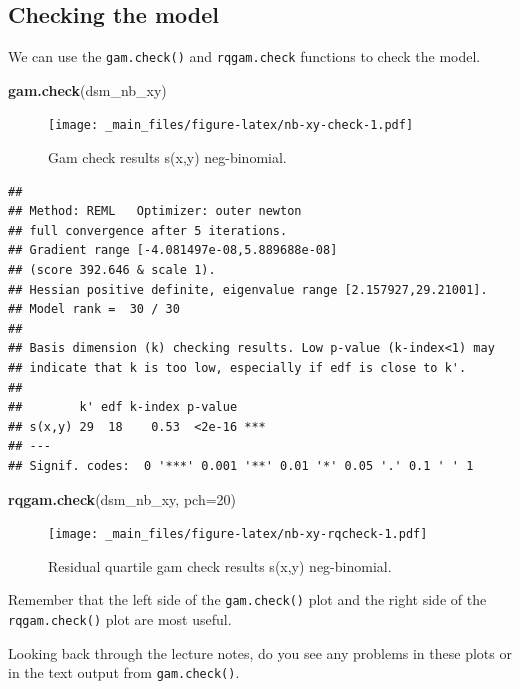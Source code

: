 \documentclass[]{book}
\newenvironment{Shaded}{\begin{snugshade}}{\end{snugshade}}
\newcommand{\KeywordTok}[1]{\textcolor[rgb]{0.13,0.29,0.53}{\textbf{#1}}}
\newcommand{\DataTypeTok}[1]{\textcolor[rgb]{0.13,0.29,0.53}{#1}}
\newcommand{\DecValTok}[1]{\textcolor[rgb]{0.00,0.00,0.81}{#1}}
\newcommand{\NormalTok}[1]{#1}
\theoremstyle{definition}
\theoremstyle{definition}
\theoremstyle{remark}
\begin{document}
\subsection{Checking the model}\label{checking-the-model}

We can use the \texttt{gam.check()} and \texttt{rqgam.check} functions
to check the model.

\begin{Shaded}
\begin{Highlighting}[]
\KeywordTok{gam.check}\NormalTok{(dsm_nb_xy)}
\end{Highlighting}
\end{Shaded}

\begin{figure}
\centering
\texttt{[image: \_main\_files/figure-latex/nb-xy-check-1.pdf]}
\caption{\label{fig:nb-xy-check}Gam check results s(x,y) neg-binomial.}
\end{figure}

\begin{verbatim}
## 
## Method: REML   Optimizer: outer newton
## full convergence after 5 iterations.
## Gradient range [-4.081497e-08,5.889688e-08]
## (score 392.646 & scale 1).
## Hessian positive definite, eigenvalue range [2.157927,29.21001].
## Model rank =  30 / 30 
## 
## Basis dimension (k) checking results. Low p-value (k-index<1) may
## indicate that k is too low, especially if edf is close to k'.
## 
##        k' edf k-index p-value    
## s(x,y) 29  18    0.53  <2e-16 ***
## ---
## Signif. codes:  0 '***' 0.001 '**' 0.01 '*' 0.05 '.' 0.1 ' ' 1
\end{verbatim}

\begin{Shaded}
\begin{Highlighting}[]
\KeywordTok{rqgam.check}\NormalTok{(dsm_nb_xy, }\DataTypeTok{pch=}\DecValTok{20}\NormalTok{)}
\end{Highlighting}
\end{Shaded}

\begin{figure}
\centering
\texttt{[image: \_main\_files/figure-latex/nb-xy-rqcheck-1.pdf]}
\caption{\label{fig:nb-xy-rqcheck}Residual quartile gam check results s(x,y)
neg-binomial.}
\end{figure}

Remember that the left side of the \texttt{gam.check()} plot and the
right side of the \texttt{rqgam.check()} plot are most useful.

Looking back through the lecture notes, do you see any problems in these
plots or in the text output from \texttt{gam.check()}.
\end{document}
